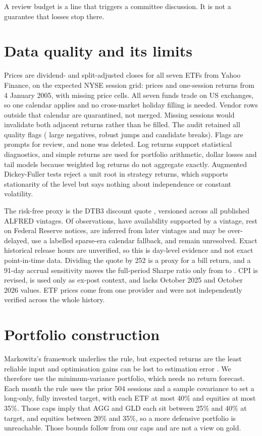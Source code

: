 \documentclass[11pt,a4paper]{article}
\begin{document}
A review budget is a line that triggers a committee discussion. It is not a guarantee that losses stop there.

\section{Data quality and its limits}
Prices are dividend- and split-adjusted closes for all seven ETFs from Yahoo Finance, on the expected NYSE session grid: \qePriceSessions{} prices and \qeReturnSessions{} one-session returns from 4 January 2005, with \qeMissingCells{} missing price cells. All seven funds trade on US exchanges, so one calendar applies and no cross-market holiday filling is needed. Vendor rows outside that calendar are quarantined, not merged. Missing sessions would invalidate both adjacent returns rather than be filled. The audit retained all \qeFlags{} quality flags (\qeFlagNegative{} large negatives, \qeFlagJump{} robust jumps and \qeFlagBreak{} candidate breaks). Flags are prompts for review, and none was deleted. Log returns support statistical diagnostics, and simple returns are used for portfolio arithmetic, dollar losses and tail models because weighted log returns do not aggregate exactly. Augmented Dickey-Fuller tests reject a unit root in strategy returns, which supports stationarity of the level but says nothing about independence or constant volatility.

The risk-free proxy is the DTB3 discount quote \citep{fredDtb3}, versioned across all \qeVintages{} published ALFRED vintages. Of \qeRfObservations{} observations, \qeRfSupported{} have availability supported by a vintage, \qeRfDocumented{} rest on Federal Reserve notices, \qeRfInferred{} are inferred from later vintages and may be over-delayed, \qeRfFallback{} use a labelled sparse-era calendar fallback, and \qeRfUnresolved{} remain unresolved. Exact historical release hours are unverified, so this is day-level evidence and not exact point-in-time data. Dividing the quote by 252 is a proxy for a bill return, and a 91-day accrual sensitivity moves the full-period Sharpe ratio only from \qeSharpePrimary{} to \qeSharpeAccrual{}. CPI \citep{fredCpi} is revised, is used only as ex-post context, and lacks October 2025 and October 2026 values. ETF prices come from one provider and were not independently verified across the whole history.

\section{Portfolio construction}
Markowitz's framework \citep{markowitz1952} underlies the rule, but expected returns are the least reliable input and optimisation gains can be lost to estimation error \citep{demiguel2009}. We therefore use the minimum-variance portfolio, which needs no return forecast. Each month the rule uses the prior 504 sessions and a sample covariance to set a long-only, fully invested target, with each ETF at most 40\% and equities at most 35\%. Those caps imply that AGG and GLD each sit between 25\% and 40\% at target, and equities between 20\% and 35\%, so a more defensive portfolio is unreachable. Those bounds follow from our caps and are not a view on gold.
\end{document}
